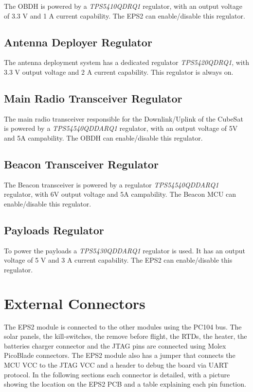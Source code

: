 The OBDH is powered by a \textit{TPS5410QDRQ1} regulator, with an output voltage of 3.3 V and 1 A current capability. The EPS2 can enable/disable this regulator.

\subsection{Antenna Deployer Regulator}

The antenna deployment system has a dedicated regulator \textit{TPS5420QDRQ1}, with 3.3 V output voltage and 2 A current capability. This regulator is always on.

\subsection{Main Radio Transceiver Regulator}

The main radio transceiver responsible for the Downlink/Uplink of the CubeSat is powered by a \textit{TPS54540QDDARQ1} regulator, with an output voltage of 5V and 5A campability. The OBDH can enable/disable this regulator.

\subsection{Beacon Transceiver Regulator}

The Beacon transceiver is powered by a regulator \textit{TPS54540QDDARQ1} regulator, with 6V output voltage and 5A campability. The Beacon MCU can enable/disable this regulator.

\subsection{Payloads Regulator}

To power the payloads a \textit{TPS5430QDDARQ1} regulator is used. It has an output voltage of 5 V and 3 A current capability. The EPS2 can enable/disable this regulator.

\section{External Connectors}

The EPS2 module is connected to the other modules using the PC104 bus. The solar panels, the kill-switches, the remove before flight, the RTDs, the heater, the batteries charger connector and the JTAG pins are connected using Molex PicoBlade connectors. The EPS2 module also has a jumper that connects the MCU VCC to the JTAG VCC and a header to debug the board via UART protocol. In the following sections each connector is detailed, with a picture showing the location on the EPS2 PCB and a table explaining each pin function.

